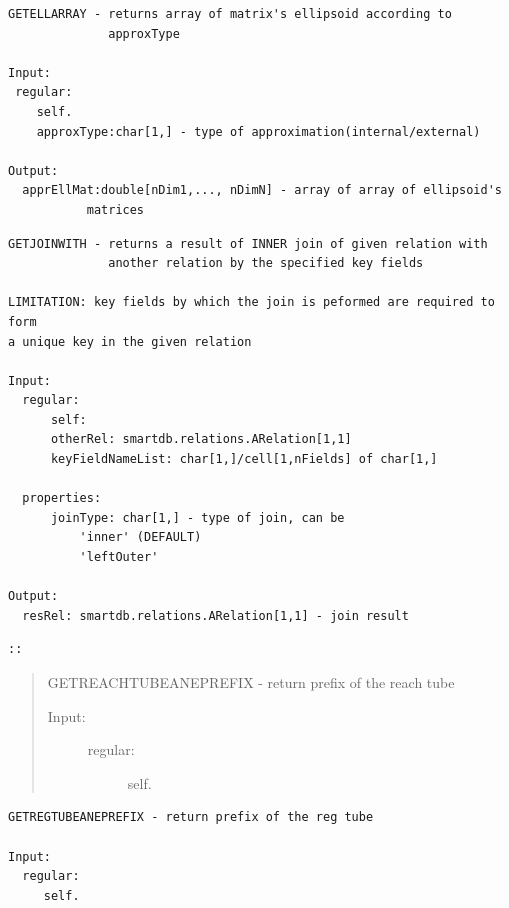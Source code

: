 \documentclass[letterpaper,10pt,english]{sphinxmanual}
\begin{document}
\begin{Verbatim}[commandchars=\\\{\}]
GETELLARRAY - returns array of matrix's ellipsoid according to
              approxType

Input:
 regular:
    self.
    approxType:char[1,] - type of approximation(internal/external)

Output:
  apprEllMat:double[nDim1,..., nDimN] - array of array of ellipsoid's
           matrices
\end{Verbatim}

\begin{Verbatim}[commandchars=\\\{\}]
GETJOINWITH - returns a result of INNER join of given relation with
              another relation by the specified key fields

LIMITATION: key fields by which the join is peformed are required to form
a unique key in the given relation

Input:
  regular:
      self:
      otherRel: smartdb.relations.ARelation[1,1]
      keyFieldNameList: char[1,]/cell[1,nFields] of char[1,]

  properties:
      joinType: char[1,] - type of join, can be
          'inner' (DEFAULT)
          'leftOuter'

Output:
  resRel: smartdb.relations.ARelation[1,1] - join result
\end{Verbatim}

\begin{Verbatim}[commandchars=\\\{\}]
::
\end{Verbatim}
\begin{quote}

GETREACHTUBEANEPREFIX - return prefix of the reach tube
\begin{description}
\item[{Input:}] \leavevmode\begin{description}
\item[{regular:}] \leavevmode
self.

\end{description}

\end{description}
\end{quote}

\begin{Verbatim}[commandchars=\\\{\}]
GETREGTUBEANEPREFIX - return prefix of the reg tube

Input:
  regular:
     self.
\end{Verbatim}
\end{document}
